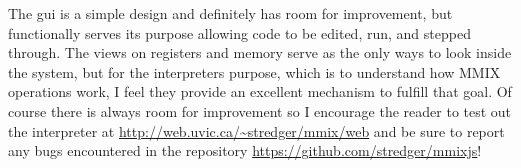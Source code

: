 \documentclass[conference]{IEEEtran}
\begin{document}
The gui is a simple design and definitely has room for improvement, but functionally serves its purpose allowing code to be edited, run, and stepped through. The views on registers and memory serve as the only ways to look inside the system, but for the interpreters purpose, which is to understand how MMIX operations work, I feel they provide an excellent mechanism  to fulfill that goal. Of course there is always room for improvement so I encourage the reader to test out the interpreter at \url{http://web.uvic.ca/~stredger/mmix/web} and be sure to report any bugs encountered in the repository \url{https://github.com/stredger/mmixjs}!


\vspace{0.5cm}


\end{document}
